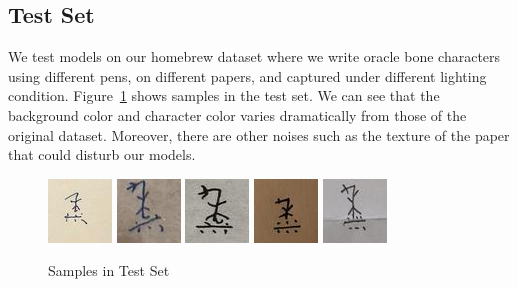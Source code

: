 \documentclass[journal]{IEEEtran}
\begin{document}
\subsection{Test Set}
We test models on our homebrew dataset where we write oracle bone characters using different pens, on different papers, and captured under different lighting condition.
Figure~\ref{fig:testset} shows samples in the test set.
We can see that the background color and character color varies dramatically from those of the original dataset.
Moreover, there are other noises such as the texture of the paper that could disturb our models.
\begin{figure}[h]
	\centering
	\includegraphics[width=0.19\linewidth]{fig/testset/test_bxy_2_30.jpg}
	\includegraphics[width=0.19\linewidth]{fig/testset/test_lcx_1_40.jpg}
	\includegraphics[width=0.19\linewidth]{fig/testset/test_ljy_2_28.jpg}
	\includegraphics[width=0.19\linewidth]{fig/testset/test_wzy_1_30.jpg}
	\includegraphics[width=0.19\linewidth]{fig/testset/test_xsn_2_28.jpg}
	\caption{Samples in Test Set}
	\label{fig:testset}
\end{figure}
\end{document}
